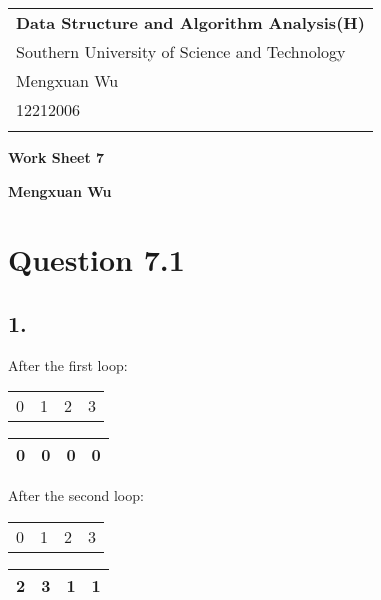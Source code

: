 \documentclass[a4paper,12pt]{article}
\begin{document}
\thispagestyle{empty} %

\begin{tabular}{p{15.5cm}}
{\large \bf Data Structure and Algorithm Analysis(H)} \\
Southern University of Science and Technology \\ Mengxuan Wu \\ 12212006 \\
\hline
\\
\end{tabular}

\vspace*{0.3cm} %

\begin{center}
	{\Large \bf Work Sheet 7}
	\vspace{2mm}

	{\bf Mengxuan Wu}
		
\end{center}  

\vspace{0.4cm}

\section*{Question 7.1}

\subsection*{1.}

After the first loop:
\begin{center}
	\begin{tabular}{cccc}
		0 & 1 & 2 & 3 \\
	\end{tabular}

	\begin{tabular}{|c|c|c|c|}
		\hline 
		0 & 0 & 0 & 0 \\
		\hline
	\end{tabular}
\end{center}

After the second loop:
\begin{center}
	\begin{tabular}{cccc}
		0 & 1 & 2 & 3 \\
	\end{tabular}

	\begin{tabular}{|c|c|c|c|}
		\hline 
		2 & 3 & 1 & 1 \\
		\hline
	\end{tabular}
\end{center}
\end{document}
